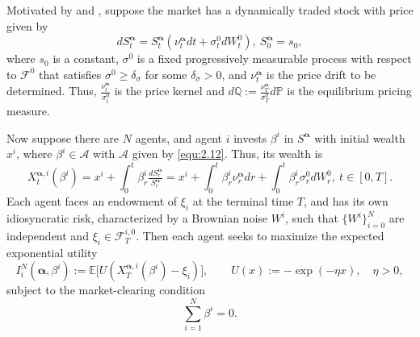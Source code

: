 \documentclass[10pt,a4paper]{article}
\newcommand{\R}{\mathbb{R}}
\newcommand{\be}{\begin{equation}}
\newcommand{\ee}{\end{equation}}
\newcommand{\MF}{{\mathcal{F}}}
\newcommand{\MA}{{\mathcal{A}}}
\newcommand{\Balpha}{\boldsymbol{\alpha}}
\newcommand{\Bx}{{\mathbf{x}}}
\theoremstyle{plain}
\theoremstyle{definition}
\numberwithin{equation}{section}
\begin{document}
Motivated by \cite{RefN10} and \cite{Kardaras2022}, suppose the market has a dynamically traded stock with price given by
\be
\label{equ:stoch-liq}
dS_{t}^{ \Balpha} = S_{t}^{ \Balpha}( \nu_{t}^{\Balpha} dt+\sigma_{t}^0 dW_{t}^0  ), \ S^{\Balpha}_0=s_0,
\ee
where $s_0$ is a constant, $ \sigma^0$ is a fixed progressively measurable process with respect to $\MF^0$ that satisfies $\sigma^{0} \geq \delta_{\sigma}$ for some $\delta_{\sigma} > 0$, and $\nu_{t}^{\Balpha} $ is the price drift to be determined. Thus, $\frac{\nu^{\Balpha}_t}{\sigma_t^0}$ is the price kernel and $d \mathbb Q:= \frac{\nu^{\Balpha}_T}{\sigma_T^0} d \mathbb{P}$ is the equilibrium pricing measure.

Now suppose there are $N$ agents, and agent $i$ invests $\beta^i$ in $S^{ \Balpha}$ with initial wealth $x^i$, where $\beta^i \in \MA$ with $\MA$ given by \eqref{equ:2.12}. Thus, its wealth is 
\begin{equation}
\label{equ:welth-liq}
X_{t}^{  \Balpha, i}(\beta^i) = x^i + \int_{0}^{t}\beta_{r}^{i}\tfrac{dS_{r}^{ \Balpha}}{S_{r}^{ \Balpha}} = x^i + \int_{0}^{t}{\beta_{r}^{i} \nu_{r}^{ \Balpha} dr} + \int_{0}^{t}{\beta_{r}^{i}\sigma_{r}^0 dW_{r}^0 } , \ t \in [0,T].
\end{equation}
Each agent faces an endowment of \(\xi_i\) at the terminal time \(T\), and has its own idiosyncratic risk, characterized by a Brownian noise $W^i$, such that $\{W^i\}_{i=0}^N$ are independent and $\xi_i \in \MF^{i,0}_T.$ Then each agent seeks to maximize the expected exponential utility
\begin{equation}
\label{eq:uti-liq}
I_{i}^{N}(\Balpha, \beta^i)
:=
\mathbb{E}
\bigl[
U(X_{T}^{\Balpha,i}(\beta^i)-\xi_i)
\bigr],
\qquad
U(x):=-\exp(-\eta x),
\quad
\eta>0,
\end{equation}
subject to the market-clearing condition
\begin{equation}
\label{equ:liqui-cond.}
\sum_{i=1}^{N}\beta^i = 0.
\end{equation}


\end{document}
